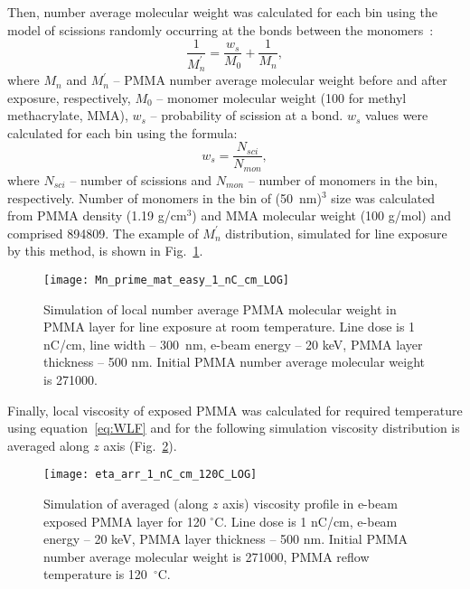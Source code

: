 Then, number average molecular weight was calculated for each bin using the model of scissions randomly occurring at the bonds between the monomers~\cite{Ku1969}:
\begin{equation}
	\frac{1}{M_n^\prime} = \frac{w_s}{M_0} + \frac{1}{M_n},
\end{equation}
where $M_n$ and $M_n^\prime$ -- PMMA number average molecular weight before and after exposure, respectively, $M_0$ -- monomer molecular weight (100 for methyl methacrylate, MMA), $w_s$ -- probability of scission at a bond.
$w_s$ values were calculated for each bin using the formula:
\begin{equation}
	w_s = \frac{N_{sci}}{N_{mon}},
\end{equation}
where $N_{sci}$ -- number of scissions and $N_{mon}$ -- number of monomers in the bin, respectively.
Number of monomers in the bin of (50~nm)$^3$ size was calculated from PMMA density (1.19 g/cm$^3$) and MMA molecular weight (100 g/mol) and comprised 894809.
The example of $M_n^\prime$ distribution, simulated for line exposure by this method, is shown in Fig.~\ref{fig:Mn_hist}.

\begin{figure}
	\centering
	\texttt{[image: Mn\_prime\_mat\_easy\_1\_nC\_cm\_LOG]}
	\caption{
		Simulation of local number average PMMA molecular weight in PMMA layer for line exposure at room temperature.
		Line dose is 1 nC/cm, line width -- 300~nm, e-beam energy -- 20 keV, PMMA layer thickness -- 500 nm.
		Initial PMMA number average molecular weight is 271000.
	}
	\label{fig:Mn_hist}
\end{figure}

Finally, local viscosity of exposed PMMA was calculated for required temperature using equation~\ref{eq:WLF} and for the following simulation viscosity distribution is averaged along $z$ axis (Fig.~\ref{fig:eta_arr}).

\begin{figure}
	\centering
	\texttt{[image: eta\_arr\_1\_nC\_cm\_120C\_LOG]}
	\caption{
			Simulation of averaged (along $z$ axis) viscosity profile in e-beam exposed PMMA layer for 120 $^\circ$C.
			Line dose is 1 nC/cm, e-beam energy -- 20 keV, PMMA layer thickness -- 500 nm.
			Initial PMMA number average molecular weight is 271000, PMMA reflow temperature is 120~$^\circ$C.
		}
	\label{fig:eta_arr}
\end{figure}
